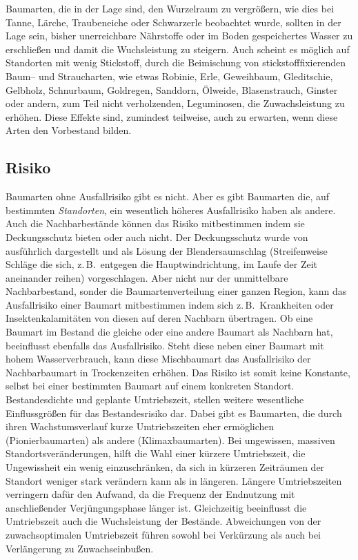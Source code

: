 \documentclass[twocolumn]{scrartcl}
\begin{document}
Baumarten, die in der Lage sind, den Wurzelraum zu vergrößern, wie dies
bei Tanne, Lärche, Traubeneiche oder Schwarzerle \cite[S.~114, 130,
150, 180]{koestler1969WurzelnDerWaldbaeume} beobachtet wurde, sollten
in der Lage sein, bisher unerreichbare Nährstoffe oder im Boden
gespeichertes Wasser zu erschließen und damit die Wuchsleistung zu
steigern. Auch scheint es möglich auf Standorten mit wenig Stickstoff,
durch die Beimischung von stickstofffixierenden Baum-- und
Straucharten, wie etwas Robinie, Erle, Geweihbaum, Gleditschie,
Gelbholz, Schnurbaum, Goldregen, Sanddorn, Ölweide, Blasenstrauch,
Ginster oder andern, zum Teil nicht verholzenden, Leguminosen, die
Zuwachsleistung zu erhöhen. Diese Effekte sind, zumindest teilweise,
auch zu erwarten, wenn diese Arten den Vorbestand bilden.

\subsection{Risiko}
\label{ssec:risiko}

Baumarten ohne Ausfallrisiko gibt es nicht. Aber es gibt Baumarten
die, auf bestimmten \emph{Standorten}, ein wesentlich höheres
Ausfallrisiko haben als andere. Auch die Nachbarbestände können das
Risiko mitbestimmen indem sie Deckungsschutz bieten oder auch nicht.
Der Deckungsschutz wurde von
\cite{wagner1923DerBlendersaumschlagUndSeinSystem} ausführlich
dargestellt und als Lösung der Blendersaumschlag (Streifenweise
Schläge die sich, z.\,B.\ entgegen die Hauptwindrichtung, im Laufe der
Zeit aneinander reihen) vorgeschlagen. Aber nicht nur der unmittelbare
Nachbarbestand, sonder die Baumartenverteilung einer ganzen Region,
kann das Ausfallrisiko einer Baumart mitbestimmen indem sich z.\,B.\
Krankheiten oder Insektenkalamitäten von diesen auf deren Nachbarn
übertragen. Ob eine Baumart im Bestand die gleiche oder eine
andere Baumart als Nachbarn hat, beeinflusst ebenfalls das
Ausfallrisiko. Steht diese neben einer Baumart mit hohem
Wasserverbrauch, kann diese Mischbaumart das Ausfallrisiko der
Nachbarbaumart in Trockenzeiten erhöhen. Das Risiko ist somit keine
Konstante, selbst bei einer bestimmten Baumart auf einem konkreten
Standort. Bestandesdichte und geplante Umtriebszeit, stellen weitere
wesentliche Einflussgrößen für das Bestandesrisiko dar. Dabei gibt es
Baumarten, die durch ihren Wachstumsverlauf kurze Umtriebszeiten eher
ermöglichen (Pionierbaumarten) als andere (Klimaxbaumarten). Bei
ungewissen, massiven Standortsveränderungen, hilft die Wahl einer
kürzere Umtriebszeit, die Ungewissheit ein wenig einzuschränken, da
sich in kürzeren Zeiträumen der Standort weniger stark verändern kann
als in längeren. Längere Umtriebszeiten verringern dafür den Aufwand,
da die Frequenz der Endnutzung mit anschließender Verjüngungsphase
länger ist. Gleichzeitig beeinflusst die Umtriebszeit auch die
Wuchsleistung der Bestände. Abweichungen von der zuwachsoptimalen
Umtriebszeit führen sowohl bei Verkürzung als auch bei Verlängerung zu
Zuwachseinbußen.
\end{document}
